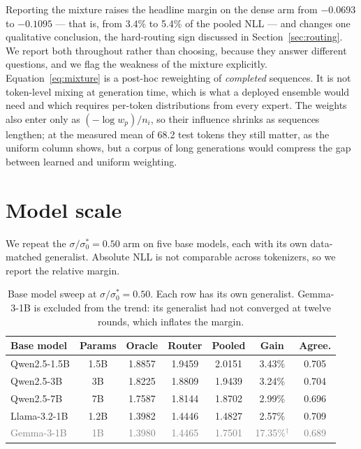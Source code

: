\documentclass{article}
\begin{document}
Reporting the mixture raises the headline margin on the dense arm from $-0.0693$ to $-0.1095$
--- that is, from 3.4\% to 5.4\% of the pooled NLL --- and changes one qualitative conclusion, the
hard-routing sign discussed in Section~\ref{sec:routing}. We report both throughout rather than
choosing, because they answer different questions, and we flag the weakness of the mixture
explicitly. Equation~\ref{eq:mixture} is a post-hoc reweighting of \emph{completed} sequences. It is
not token-level mixing at generation time, which is what a deployed ensemble would need and which
requires per-token distributions from every expert. The weights also enter only as $(-\log w_p)/n_i$,
so their influence shrinks as sequences lengthen; at the measured mean of 68.2 test tokens they still
matter, as the uniform column shows, but a corpus of long generations would compress the gap between
learned and uniform weighting.

\section{Model scale}
\label{sec:scale}
We repeat the $\sigma/\sigma_0^*=0.50$ arm on five base models, each with its own data-matched
generalist. Absolute NLL is not comparable across tokenizers, so we report the relative margin.

\begin{table}[t]
\centering
\caption{Base model sweep at $\sigma/\sigma_0^*=0.50$. Each row has its own generalist. Gemma-3-1B is
excluded from the trend: its generalist had not converged at twelve rounds, which inflates the
margin.}
\label{tab:scale}
\small
\begin{tabular}{lcccccc}
\toprule
Base model & Params & Oracle & Router & Pooled & Gain & Agree. \\
\midrule
Qwen2.5-1.5B & 1.5B & 1.8857 & 1.9459 & 2.0151 & 3.43\% & 0.705 \\
Qwen2.5-3B   & 3B   & 1.8225 & 1.8809 & 1.9439 & 3.24\% & 0.704 \\
Qwen2.5-7B   & 7B   & 1.7587 & 1.8144 & 1.8702 & 2.99\% & 0.696 \\
Llama-3.2-1B & 1.2B & 1.3982 & 1.4446 & 1.4827 & 2.57\% & 0.709 \\
\midrule
\textcolor{gray}{Gemma-3-1B} & \textcolor{gray}{1B} & \textcolor{gray}{1.3980} &
\textcolor{gray}{1.4465} & \textcolor{gray}{1.7501} & \textcolor{gray}{17.35\%$^\dagger$} &
\textcolor{gray}{0.689} \\
\bottomrule
\end{tabular}
\end{table}
\end{document}
